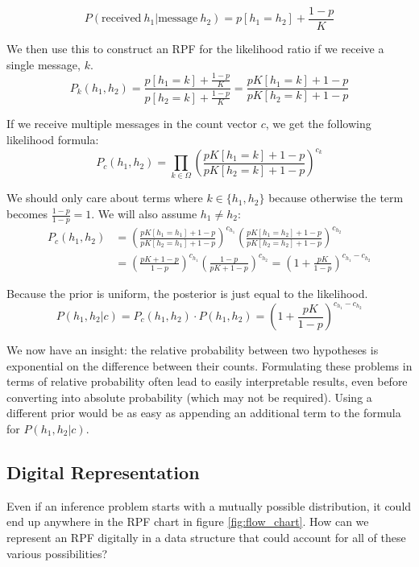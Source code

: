 \documentclass[twoside]{article}
\theoremstyle{plain}%
\theoremstyle{definition}
\theoremstyle{remark}
\begin{document}
\[P(\text{received}\: h_1 | \text{message}\: h_2) = p[h_1 = h_2] + \frac{1-p}{K}\]
 
We then use this to construct an RPF for the likelihood ratio if we receive a single message, \(k\).
\[P_k(h_1, h_2) = \frac{p[h_1 = k] + \frac{1-p}{K}}{p[h_2 = k] + \frac{1-p}{K}} = \frac{pK[h_1 = k] + 1-p}{pK[h_2 = k] + 1-p}\]

If we receive multiple messages in the count vector \(c\), we get the following likelihood formula:
\[P_c(h_1, h_2) = \prod_{k \in \Omega}\left(\frac{pK[h_1 = k] + 1-p}{pK[h_2 = k] + 1-p}\right)^{c_k}\]

We should only care about terms where \(k \in \{h_1, h_2\}\) because otherwise the term becomes \(\frac{1-p}{1-p} = 1\). We will also assume \(h_1 \neq h_2\):
\begin{equation}
\begin{aligned}
P_c(h_1, h_2) &= \left(\frac{pK[h_1 = h_1] + 1-p}{pK[h_2 = h_1] + 1-p}\right)^{c_{h_1}} \left(\frac{pK[h_1 = h_2] + 1-p}{pK[h_2 = h_2] + 1-p}\right)^{c_{h_2}} \\
& = \left(\frac{pK + 1-p}{1-p}\right)^{c_{h_1}} \left(\frac{1-p}{pK + 1-p}\right)^{c_{h_2}} = \left(1 + \frac{pK}{1-p}\right)^{c_{h_1} - c_{h_2}}
\end{aligned}
\end{equation}

Because the prior is uniform, the posterior is just equal to the likelihood.
\[P(h_1, h_2 | c) = P_c(h_1, h_2) \cdot P(h_1, h_2) = \left(1 + \frac{pK}{1-p}\right)^{c_{h_1} - c_{h_2}} \]

We now have an insight: the relative probability between two hypotheses is exponential on the difference between their counts. Formulating these problems in terms of relative probability often lead to easily interpretable results, even before converting into absolute probability (which may not be required). Using a different prior would be as easy as appending an additional term to the formula for \(P(h_1, h_2|c)\).

\subsection{Digital Representation}

Even if an inference problem starts with a mutually possible distribution, it could end up anywhere in the RPF chart in figure \ref{fig:flow_chart}. How can we represent an RPF digitally in a data structure that could account for all of these various possibilities?
\end{document}
